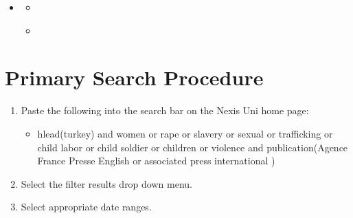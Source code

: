 \documentclass[letterpaper,10pt,english]{sphinxmanual}
\begin{document}
\begin{sphinxShadowBox}
\begin{itemize}
\item {} 
\sphinxAtStartPar
{}\label{\detokenize{event_query_procedure:id2}}{\hyperref[\detokenize{event_query_procedure:event-query-procedure}]{}}
\begin{itemize}
\item {} 
\sphinxAtStartPar
{}\label{\detokenize{event_query_procedure:id3}}{\hyperref[\detokenize{event_query_procedure:primary-search-procedure}]{}}

\item {} 
\sphinxAtStartPar
{}\label{\detokenize{event_query_procedure:id4}}{\hyperref[\detokenize{event_query_procedure:query-result-sorting-procedure}]{}}

\end{itemize}

\end{itemize}
\end{sphinxShadowBox}


\section{Primary Search Procedure}
\label{\detokenize{event_query_procedure:primary-search-procedure}}\begin{enumerate}
%
\item {} 
\sphinxAtStartPar
Paste the following into the search bar on the Nexis Uni home page:
\begin{itemize}
\item {} 
\sphinxAtStartPar
hlead(turkey) and women or rape or slavery or sexual or trafficking or child labor or child soldier or children or violence and publication(Agence France Presse \sphinxhyphen{} English or associated press international )

\end{itemize}

\item {} 
\sphinxAtStartPar
Select the filter results drop down menu.

\item {} 
\sphinxAtStartPar
Select appropriate date ranges.

\end{enumerate}
\end{document}
